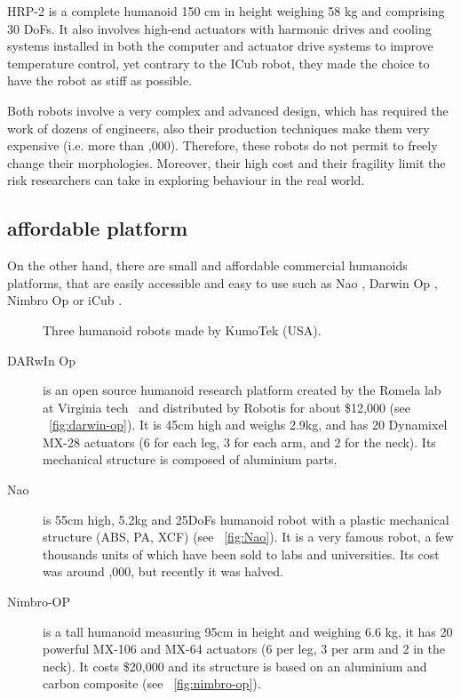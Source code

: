 HRP-2 is a complete humanoid 150 cm in height weighing 58 kg and comprising 30 DoFs. It also involves high-end actuators with harmonic drives and cooling systems installed in both the computer and actuator drive systems to improve temperature control, yet contrary to the ICub robot, they made the choice to have the robot as stiff as possible.

Both robots involve a very complex and advanced design, which has required the work of dozens of engineers, also their production techniques make them very expensive (i.e. more than ,000). Therefore, these robots do not permit to freely change their morphologies. Moreover, their high cost and their fragility limit the risk researchers can take in exploring behaviour in the real world.



\subsection{affordable platform} %

On the other hand, there are small and affordable commercial humanoids platforms, that are easily accessible and easy to use such as Nao \cite{gouaillier2008nao}, Darwin Op \cite{ha2011development}, Nimbro Op \cite{schwarznimbro} or iCub \cite{metta2008icub}.

\begin{figure}[tb]
\centering
    \hfil
    \hfil
    \caption{Three humanoid robots made by KumoTek (USA).}
    \label{fig:kumotek_robots}
\end{figure}


\begin{description}
    \item[DARwIn Op] is an open source humanoid research platform created by the Romela lab at Virginia tech~\parencite{ha2011development} and distributed by Robotis for about \$12,000 (see \figurename~\ref{fig:darwin-op}). It is 45cm high and weighs 2.9kg, and has 20 Dynamixel MX-28 actuators (6 for each leg, 3 for each arm, and 2 for the neck). Its mechanical structure is composed of aluminium parts.
    \item[Nao] is 55cm high, 5.2kg and 25DoFs humanoid robot with a plastic mechanical structure (ABS, PA, XCF) (see \figurename~\ref{fig:Nao}). It is a very famous robot, a few thousands units of which have been sold to labs and universities. Its cost was around ,000, but recently it was halved.
    \item[Nimbro-OP] is a tall humanoid measuring 95cm in height and weighing 6.6 kg, it has 20 powerful MX-106 and MX-64 actuators (6 per leg, 3 per arm and 2 in the neck). It costs \$20,000 and its structure is based on an aluminium and carbon composite (see \figurename~\ref{fig:nimbro-op}).
\end{description}

